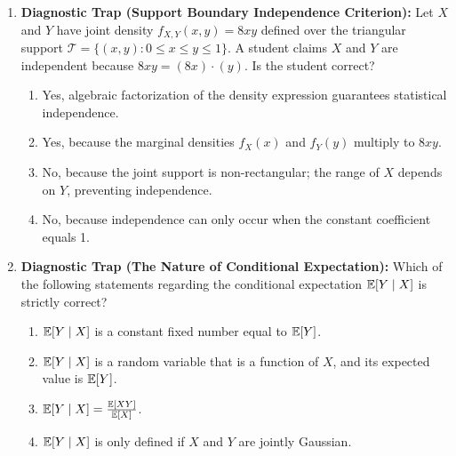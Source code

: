 \begin{enumerate}[resume]
\item \textbf{Diagnostic Trap (Support Boundary Independence Criterion):}
Let $X$ and $Y$ have joint density $f_{X,Y}(x, y) = 8xy$ defined over the triangular support $\mathcal{T} = \{(x, y) \colon 0 \le x \le y \le 1\}$. A student claims $X$ and $Y$ are independent because $8xy = (8x) \cdot (y)$. Is the student correct?
\begin{enumerate}
    \item Yes, algebraic factorization of the density expression guarantees statistical independence.
    \item Yes, because the marginal densities $f_X(x)$ and $f_Y(y)$ multiply to $8xy$.
    \item No, because the joint support is non-rectangular; the range of $X$ depends on $Y$, preventing independence.
    \item No, because independence can only occur when the constant coefficient equals 1.
\end{enumerate}

\item \textbf{Diagnostic Trap (The Nature of Conditional Expectation):}
Which of the following statements regarding the conditional expectation $\mathbb{E}[Y \mid X]$ is strictly correct?
\begin{enumerate}
    \item $\mathbb{E}[Y \mid X]$ is a constant fixed number equal to $\mathbb{E}[Y]$.
    \item $\mathbb{E}[Y \mid X]$ is a random variable that is a function of $X$, and its expected value is $\mathbb{E}[Y]$.
    \item $\mathbb{E}[Y \mid X] = \frac{\mathbb{E}[XY]}{\mathbb{E}[X]}$.
    \item $\mathbb{E}[Y \mid X]$ is only defined if $X$ and $Y$ are jointly Gaussian.
\end{enumerate}
\end{enumerate}
